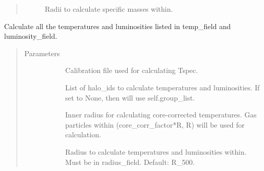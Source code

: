\documentclass[letterpaper,10pt,english]{sphinxmanual}
\begin{document}
\begin{fulllineitems}
\begin{fulllineitems}
\begin{quote}
\begin{description}
\begin{description}
\item[{}] \leavevmode
Radii to calculate specific masses within.

\end{description}

\end{description}\end{quote}

\end{fulllineitems}


\begin{fulllineitems}
\label{\detokenize{halo_analysis:modules.halo_analysis.halo_props.calcu_temp_lumi}}
Calculate all the temperatures and luminosities listed in
temp\_field and luminosity\_field.
\begin{quote}\begin{description}
\item[{Parameters}] \leavevmode\begin{description}
\item[{}] \leavevmode
Calibration file used for calculating Tspec.

\item[{}] \leavevmode
List of halo\_ids to calculate temperatures 
and luminosities. If set to None, then will use 
self.group\_list.

\item[{}] \leavevmode
Inner radius for calculating core-corrected 
temperatures. Gas particles within 
(core\_corr\_factor*R, R) will be used for calculation.

\item[{}] \leavevmode
Radius to calculate temperatures and luminosities 
within. Must be in radius\_field. Default: R\_500.

\end{description}

\end{description}\end{quote}


\end{fulllineitems}
\end{fulllineitems}
\end{document}
